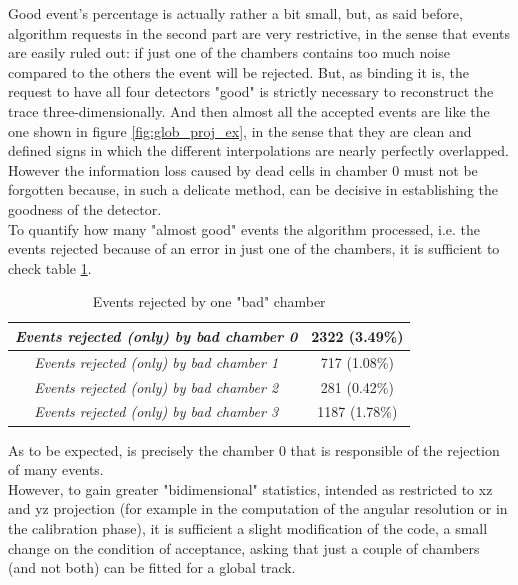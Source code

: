 \documentclass[a4paper,11pt]{book}
\begin{document}
Good event's percentage is actually rather a bit small, but, as said before, algorithm requests in the second part are very restrictive, in the sense that events are easily ruled out: if just one of the chambers contains too much noise compared to the others the event will be rejected. But, as binding it is, the request to have all four detectors "good" is strictly necessary to reconstruct the trace three-dimensionally. And then almost all the accepted events are like the one shown in figure \ref{fig:glob_proj_ex}, in the sense that they are clean and defined signs in which the different interpolations are nearly perfectly overlapped.\\
However the information loss caused by dead cells in chamber 0 must not be forgotten because, in such a delicate method, can be decisive in establishing the goodness of the detector. \\
To quantify how many "almost good" events the algorithm processed, i.e. the events rejected because of an error in just one of the chambers, it is sufficient to check table \ref{tab:rejected_chamber}.\\

\begin{table}[htbp]
\centering
\begin{tabular}{c|c}
\toprule
\textit{Events rejected (only) by bad chamber 0} & 2322 (3.49\%) \\
\midrule
\textit{Events rejected (only) by bad chamber 1} & 717 (1.08\%) \\
\midrule
\textit{Events rejected (only) by bad chamber 2} & 281 (0.42\%) \\
\midrule
\textit{Events rejected (only) by bad chamber 3} & 1187 (1.78\%) \\
\bottomrule
\end{tabular}
\caption{Events rejected by one "bad" chamber}
\label{tab:rejected_chamber}
\end{table}

As to be expected, is precisely the chamber 0 that is responsible of the rejection of many events.\\
However, to gain greater "bidimensional" statistics, intended as restricted to xz and yz projection (for example in the computation of the angular resolution or in the calibration phase), it is sufficient a slight modification of the code, a small change on the condition of acceptance, asking that just a couple of chambers (and not both) can be fitted for a global track.\\
\end{document}
